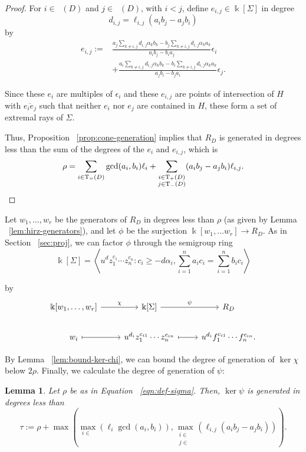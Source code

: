 \documentclass{amsart}
\theoremstyle{plain}
\newtheorem{lem}[thm]{Lemma}
\theoremstyle{definition}
\theoremstyle{remark}
\numberwithin{equation}{subsection}
\newcommand\bk{{\Bbbk}}
\newcommand\bida{a}
\newcommand\bidb{b}
\DeclareMathOperator{\Te}{T_=}
\DeclareMathOperator{\Tp}{T_+}
\DeclareMathOperator{\Tm}{T_-}
\begin{document}
\begin{proof}
\noindent
For $i \in \Tp(D)$ and $j \in \Tm(D)$, with $i < j$, define $e_{i,j}\in \bk[\Sigma]$ in degree 
\[
	d_{i,j} = \ell_{i, j}(\bida_i \bidb_j - \bida_j \bidb_i)
\]
by
\begin{align*}
e_{i,j} := &\frac{a_j\sum_{k\ne i,j} d_{i,j}\alpha_k b_k - b_j\sum_{k \ne i,j} d_{i,j} \alpha_k a_k}{a_ib_j - b_i a_j} \epsilon_i \\
&+ \frac{a_i \sum_{k\ne i,j} d_{i,j} \alpha_k b_k - b_i\sum_{k\ne i,j} d_{i,j} \alpha_ka_k}{a_jb_i - b_j a_i} \epsilon_j.
\end{align*}

Since these $e_i$ are multiples of $\epsilon_i$ and these
$e_{i,j}$ are points of intersection of $H$ with
$\overline {e_ie_j}$ such that neither $e_i$ nor $e_j$
are contained in $H$, these form a set of extremal rays of $\Sigma$.

Thus, Proposition ~\ref{prop:cone-generation} implies that 
$R_D$ is generated in 
degrees less than the sum of the degrees of the $e_i$ and $e_{i,j}$, which is
\[
	\rho = \sum_{i\in \Te(D)} \gcd(\bida_i, \bidb_i)\ell_i + \sum_{\substack{
	i \in \Tp(D) \\	j \in \Tm(D)}} (\bida_i \bidb_j- \bida_j \bidb_i)\ell_{i,j}.
\qedhere
\]\end{proof}

Let $w_1, \ldots, w_r$ be the generators of $R_D$ in degrees less than $\rho$
(as given by Lemma ~\ref{lem:hirz-generators}), and let $\phi$ be the
surjection $\bk[w_1, \ldots w_r] \to R_D$. As in Section ~\ref{sec:proj}, we can factor $\phi$ through the
semigroup ring 
\[
	\bk[\Sigma] = \left \langle u^d z_1^{c_1} \cdots z_n^{c_n} \colon c_i \geq -d
	\alpha_i, \sum_{i=1}^{n} \bida_i c_i = \sum_{i=1}^{n} \bidb_i c_i
	\right \rangle
\]

\noindent
by
\[
\begin{tikzcd}
	\bk[w_1,\ldots, w_r] \ar {r}{\chi} & \bk[\Sigma] \ar {r}{\psi} & R_D \\
	w_i \ar[mapsto]{r} & u^{d_i}z_1^{c_{i1}} \cdots z_n^{c_{in}} \ar[mapsto]{r} & u^{d_i}f_1^{c_{i1}} \cdots f_n^{c_{in}}.
\end{tikzcd}
\]

By Lemma ~\ref{lem:bound-ker-chi}, we can bound the degree of generation of $\ker \chi$ below
$2 \rho$.
Finally, we calculate the degree of generation of $\psi$:

\begin{lem}
\label{lem:hirz-bound-ker-psi}
Let $\rho$ be as in Equation ~\eqref{eqn:def-sigma}. Then, $\ker \psi$ is generated in degrees less than
\[
	\tau := \rho
	+ \max \left(\max_{i\in \Te}(\ell_i \gcd(a_i, b_i)), \max_{\substack{
	i \in	\Tp \\ j\in \Tm}} (\ell_{i,j} (\bida_i \bidb_j - \bida_j \bidb_i))
	\right).
\]
\end{lem}
\end{document}
